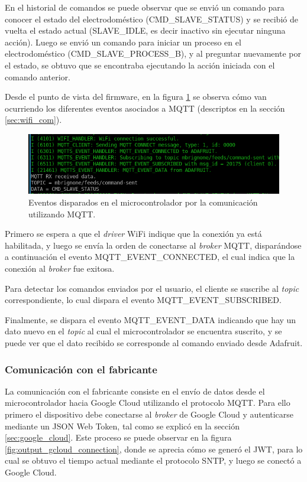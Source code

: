 En el historial de comandos se puede observar que se envió un comando para conocer el estado del electrodoméstico (CMD\_SLAVE\_STATUS) y se recibió de vuelta el estado actual (SLAVE\_IDLE, es decir inactivo sin ejecutar ninguna acción). Luego se envió un comando para iniciar un proceso en el electrodoméstico (CMD\_SLAVE\_PROCESS\_B), y al preguntar nuevamente por el estado, se obtuvo que se encontraba ejecutando la acción iniciada con el comando anterior.

Desde el punto de vista del firmware, en la figura \ref{fig:output_mqtt_connection} se observa cómo van ocurriendo los diferentes eventos asociados a MQTT (descriptos en la sección \ref{sec:wifi_com}). 

\begin{figure}[h]
\centering
\includegraphics[width=\textwidth]{./Figures/output_mqtt_connection.png}
\caption{Eventos disparados en el microcontrolador por la comunicación utilizando MQTT.}
\label{fig:output_mqtt_connection}
\end{figure}

Primero se espera a que el \emph{driver} WiFi indique que la conexión ya está habilitada, y luego se envía la orden de conectarse al \emph{broker} MQTT, disparándose a continuación el evento MQTT\_EVENT\_CONNECTED, el cual indica que la conexión al \emph{broker} fue exitosa. 

Para detectar los comandos enviados por el usuario, el cliente se suscribe al \emph{topic} correspondiente, lo cual dispara el evento MQTT\_EVENT\_SUBSCRIBED.

Finalmente, se dispara el evento MQTT\_EVENT\_DATA indicando que hay un dato nuevo en el \emph{topic} al cual el microcontrolador se encuentra suscrito, y se puede ver que el dato recibido se corresponde al comando enviado desde Adafruit.

\subsubsection{Comunicación con el fabricante}

La comunicación con el fabricante consiste en el envío de datos desde el microcontrolador hacia Google Cloud utilizando el protocolo MQTT. Para ello primero el dispositivo debe conectarse al \emph{broker} de Google Cloud y autenticarse mediante un JSON Web Token, tal como se explicó en la sección \ref{sec:google_cloud}. Este proceso se puede observar en la figura \ref{fig:output_gcloud_connection}, donde se aprecia cómo se generó el JWT, para lo cual se obtuvo el tiempo actual mediante el protocolo SNTP, y luego se conectó a Google Cloud.

